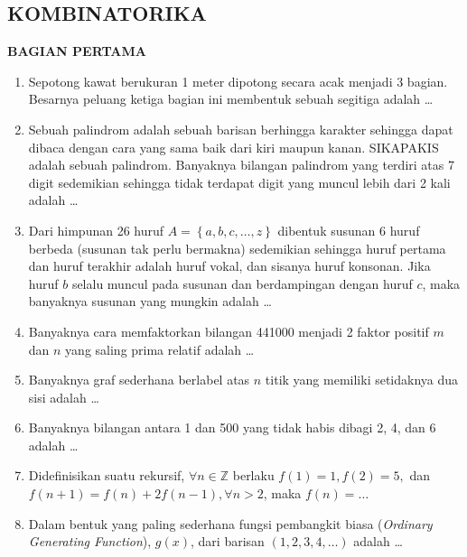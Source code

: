 \documentclass[12pt,twoside]{article}
\begin{document}
\subsection{KOMBINATORIKA}
\textbf{BAGIAN PERTAMA}
\begin{enumerate}
	\item Sepotong kawat berukuran 1 meter dipotong secara acak menjadi 3 bagian. Besarnya peluang ketiga bagian ini membentuk sebuah segitiga adalah \dots

	\item Sebuah palindrom adalah sebuah barisan berhingga karakter sehingga dapat dibaca dengan cara yang sama baik dari kiri maupun kanan. SIKAPAKIS adalah sebuah palindrom. Banyaknya bilangan palindrom yang terdiri atas 7 digit sedemikian sehingga tidak terdapat digit yang muncul lebih dari 2 kali adalah \dots

	\item Dari himpunan 26 huruf $A = \left\lbrace a,b,c,\dots,z \right\rbrace$ dibentuk susunan 6 huruf berbeda (susunan tak perlu bermakna) sedemikian sehingga huruf pertama dan huruf terakhir adalah huruf vokal, dan sisanya huruf konsonan. Jika huruf $b$ selalu muncul pada susunan dan berdampingan dengan huruf $c$, maka banyaknya susunan yang mungkin adalah \dots

	\item Banyaknya cara memfaktorkan bilangan 441000 menjadi 2 faktor positif $m$ dan $n$ yang saling prima relatif adalah \dots

	\item Banyaknya graf sederhana berlabel atas $n$ titik yang memiliki setidaknya dua sisi adalah \dots

	\item Banyaknya bilangan antara 1 dan 500 yang tidak habis dibagi 2, 4, dan 6 adalah \dots

	\item Didefinisikan suatu rekursif, $\forall n \in \mathbb{Z}$ berlaku $f(1)=1, f(2)=5, $ dan $f(n+1)= f(n)+2f(n-1), \forall n > 2$, maka $f(n) = \dots$

	\item Dalam bentuk yang paling sederhana fungsi pembangkit biasa (\textit{Ordinary Generating Function}), $g(x)$, dari barisan $(1,2,3,4,\dots)$ adalah \dots
\end{enumerate}
\end{document}
